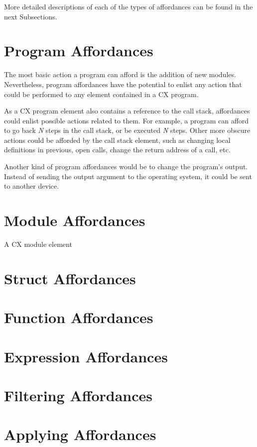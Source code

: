 More detailed descriptions of each of the types of affordances can be
found in the next Subsections.

\section{Program Affordances}
\label{program-affordances}

The most basic action a program can afford is the addition of new
modules. Nevertheless, program affordances have the potential to
enlist any action that could be performed to any element contained in
a CX program.

As a CX program element also contains a reference to the call stack,
affordances could enlist possible actions related to them. For
example, a program can afford to go back \textit{N} steps in the call
stack, or be executed \textit{N} steps. Other more obscure actions
could be afforded by the call stack element, such as changing local
definitions in previous, open calls, change the return address of a
call, etc.

Another kind of program affordances would be to change the program's
output. Instead of sending the output argument to the operating
system, it could be sent to another device.

\section{Module Affordances}
\label{module-affordances}

A CX module element

\section{Struct Affordances}
\label{struct-affordances}

\section{Function Affordances}
\label{function-affordances}

\section{Expression Affordances}
\label{expression-affordances}



\section{Filtering Affordances}
\label{filtering-affordances}

\section{Applying Affordances}
\label{affordance-filtering}
